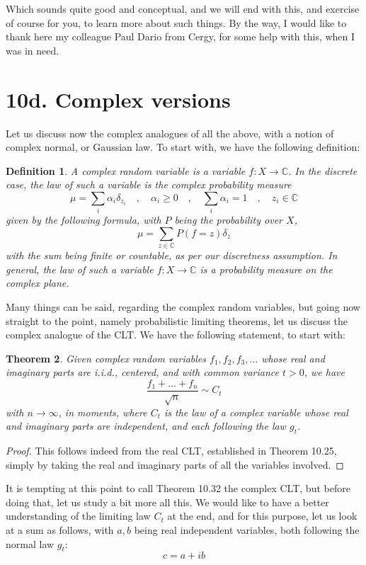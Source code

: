 \documentclass[12pt]{amsbook}
\newtheorem{theorem}{Theorem}[chapter]
\newtheorem{definition}[theorem]{Definition}
\begin{document}
Which sounds quite good and conceptual, and we will end with this, and exercise of course for you, to learn more about such things. By the way, I would like to thank here my colleague Paul Dario from Cergy, for some help with this, when I was in need.

\section*{10d. Complex versions} 

Let us discuss now the complex analogues of all the above, with a notion of complex normal, or Gaussian law. To start with, we have the following definition:

\begin{definition}
A complex random variable is a variable $f:X\to\mathbb C$. In the discrete case, the law of such a variable is the complex probability measure
$$\mu=\sum_i\alpha_i\delta_{z_i}\quad,\quad\alpha_i\geq0\quad,\quad\sum_i\alpha_i=1\quad,\quad z_i\in\mathbb C$$
given by the following formula, with $P$ being the probability over $X$,
$$\mu=\sum_{z\in\mathbb C}P(f=z)\delta_z$$
with the sum being finite or countable, as per our discretness assumption. In general, the law of such a variable $f:X\to\mathbb C$ is a probability measure on the complex plane.
\end{definition}

Many things can be said, regarding the complex random variables, but going now straight to the point, namely probabilistic limiting theorems, let us discuss the complex analogue of the CLT. We have the following statement, to start with:

\begin{theorem}
Given complex random variables $f_1,f_2,f_3,\ldots$ whose real and imaginary parts are i.i.d., centered, and with common variance $t>0$, we have
$$\frac{f_1+\ldots+f_n}{\sqrt{n}}\sim C_t$$
with $n\to\infty$, in moments, where $C_t$ is the law of a complex variable whose real and imaginary parts are independent, and each following the law $g_t$.
\end{theorem}

\begin{proof}
This follows indeed from the real CLT, established in Theorem 10.25, simply by taking the real and imaginary parts of all the variables involved.
\end{proof}

It is tempting at this point to call Theorem 10.32 the complex CLT, but before doing that, let us study a bit more all this. We would like to have a better understanding of the limiting law $C_t$ at the end, and for this purpose, let us look at a sum as follows, with $a,b$ being real independent variables, both following the normal law $g_t$:
$$c=a+ib$$
\end{document}
